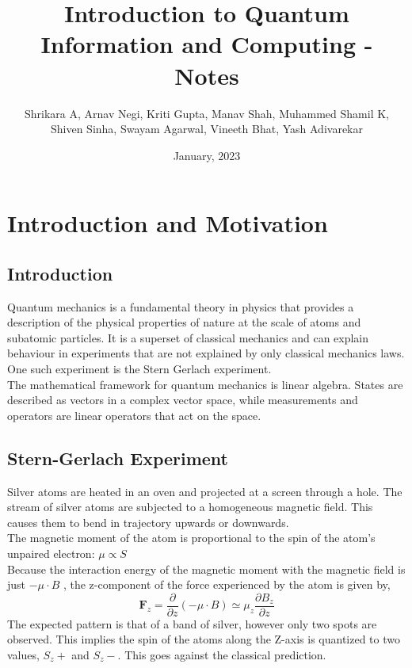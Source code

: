 \documentclass{article}
\title{Introduction to Quantum Information and Computing - Notes}
\author{Shrikara A, Arnav Negi, Kriti Gupta, Manav Shah, Muhammed Shamil K,\\ Shiven Sinha, Swayam Agarwal, Vineeth Bhat, Yash Adivarekar} %
\date{January, 2023}
\begin{document}
\maketitle
\vfill
\tableofcontents
\newpage
{}


\section{Introduction and Motivation}
\subsection{Introduction}

Quantum mechanics is a fundamental theory in physics that provides a description of the physical properties of nature at the scale of atoms and subatomic particles. It is a superset of classical mechanics and can explain
behaviour in experiments that are not explained by only classical mechanics laws. One such experiment is
the Stern Gerlach experiment.\\

The mathematical framework for quantum mechanics is linear algebra. States are described as vectors in a complex
vector space, while measurements and operators are linear operators that act on the space.\\


\subsection{Stern-Gerlach Experiment}

Silver atoms are heated in an oven and projected at a screen through a hole. The stream of silver atoms
are subjected to a homogeneous magnetic field. This causes them to bend in trajectory upwards or downwards.\\

The magnetic moment of the atom is proportional to the spin of the atom's unpaired electron: $\mu \propto S$\\

Because the interaction energy of the magnetic moment with the magnetic field
is just $-\mu \cdot B$ , the z-component of the force experienced by the atom is given by,
$$\textbf{F}_z = \frac{\partial}{\partial z}(-\mu \cdot B) \simeq \mu_z\frac{\partial B_z}{\partial z}$$
The expected pattern is that of a band of silver, however only two spots are observed. This implies
the spin of the atoms along the Z-axis is quantized to two values, $S_z+$ and $S_z-$. This goes against the classical prediction.
\end{document}
